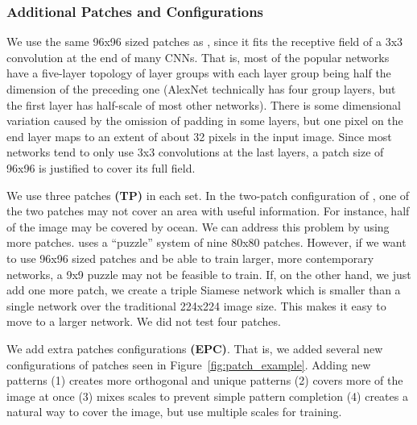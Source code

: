 \documentclass[10pt,twocolumn,letterpaper]{article}
\begin{document}
\subsubsection{Additional Patches and Configurations}

We use the same 96x96 sized patches as \cite{Doersch15}, since it fits the receptive field of a 3x3 convolution at the end of many CNNs. That is, most of the popular networks have a five-layer topology of layer groups with each layer group being half the dimension of the preceding one \cite{GoogLeNet,ResNet,DenseNet,AlexNet,Mundhenk2016} (AlexNet technically has four group layers, but the first layer has half-scale of most other networks). There is some dimensional variation caused by the omission of padding in some layers, but one pixel on the end layer maps to an extent of about 32 pixels in the input image. Since most networks tend to only use 3x3 convolutions at the last layers, a patch size of 96x96 is justified to cover its full field.

We use three patches {\bf (TP)} in each set. In the two-patch configuration of \cite{Doersch15}, one of the two patches may not cover an area with useful information. For instance, half of the image may be covered by ocean. We can address this problem by using more patches. \cite{Noroozi16a} uses a ``puzzle'' system of nine 80x80 patches. However, if we want to use 96x96 sized patches and be able to train larger, more contemporary networks, a 9x9 puzzle may not be feasible to train. If, on the other hand, we just add one more patch, we create a triple Siamese network which is smaller than a single network over the traditional 224x224 image size. This makes it easy to move to a larger network. We did not test four patches.

We add extra patches configurations {\bf (EPC)}. That is, we added several new configurations of patches seen in Figure~\ref{fig:patch_example}. Adding new patterns (1) creates more orthogonal and unique patterns (2) covers more of the image at once (3) mixes scales to prevent simple pattern completion (4) creates a natural way to cover the image, but use multiple scales for training.
\end{document}
